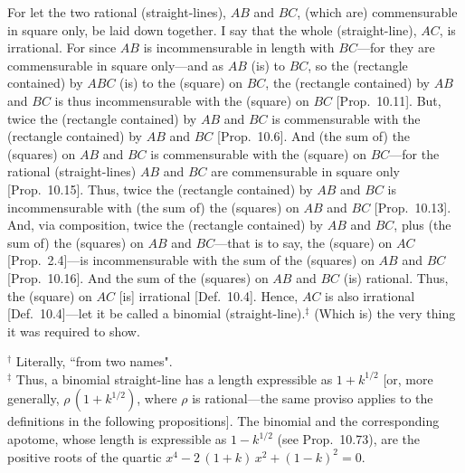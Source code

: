 \begin{Parallel}{}{}
{For let the two rational (straight-lines), $AB$ and $BC$, (which are)
commensurable in square only, be laid down together. I say that the
whole (straight-line), $AC$, is irrational.
For since $AB$ is incommensurable in length with $BC$---for they
are commensurable in square only---and as $AB$ (is) to $BC$, so
the (rectangle contained) by $ABC$ (is) to the (square) on $BC$, the (rectangle contained)
by $AB$ and $BC$ is thus incommensurable with the
(square) on $BC$ [Prop.~10.11]. But,
twice the (rectangle contained) by $AB$ and $BC$ is commensurable
with the (rectangle contained) by $AB$ and $BC$ [Prop.~10.6]. And (the sum of) the (squares) on
$AB$ and $BC$
 is commensurable with the (square) on $BC$---for the rational (straight-lines) $AB$ and $BC$ are commensurable in square only [Prop.~10.15].
Thus, twice the (rectangle contained) by $AB$ and $BC$ is incommensurable
with (the sum of) the (squares) on $AB$ and $BC$ [Prop.~10.13]. And, via composition, twice
the (rectangle contained) by $AB$ and $BC$, plus (the sum of) the (squares)
on $AB$ and $BC$---that is to say, the (square) on $AC$ [Prop.~2.4]---is incommensurable with the
sum of the (squares) on $AB$ and $BC$ [Prop.~10.16]. And the sum of the (squares) on $AB$ and $BC$ (is) rational. Thus, the (square) on $AC$ [is]
irrational [Def.~10.4]. Hence, $AC$
is also irrational [Def.~10.4]---let it be called
a binomial (straight-line).$^\ddag$  (Which is) the very thing it was required to show.}
\end{Parallel}
{\footnotesize\noindent$^\dag$ Literally, ``from two names".\\[0.5ex]
$^\ddag$ Thus, a binomial straight-line has a length
expressible as  $1 +k^{1/2}$ [or, more generally, $\rho\,(1+k^{1/2})$, where $\rho$ is rational---the same proviso applies to the definitions in the following propositions]. The binomial and the corresponding apotome, whose length is expressible as
$1-k^{1/2}$ (see Prop.~10.73), are
the positive roots of the quartic $x^4-2\,(1+k)\,x^2+ (1-k)^2 = 0$.}

